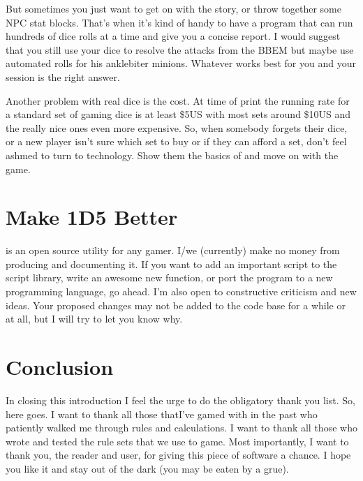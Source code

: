 But sometimes you just want to get on with the story, or throw together some
NPC stat blocks. That's when it's kind of handy to have a program that can
run hundreds of dice rolls at a time and give you a concise report. I would
suggest that you still use your dice to resolve the attacks from the BBEM
but maybe use automated rolls for his anklebiter minions. Whatever works best
for you and your session is the right answer.

Another problem with real dice is the cost. At time of print the running rate
for a standard set of gaming dice is at least \$5US with most sets around \$10US
and the really nice ones even more expensive. So, when somebody forgets their
dice, or a new player isn't sure which set to buy or if they can afford a set,
don't feel ashmed to turn to technology. Show them the basics of \progLogo and
move on with the game.


\section{Make 1D5 Better}
\label{improve}
\progLogo is an open source utility for any gamer. I/we (currently) make no
money from producing and documenting it. If you want to add an important script
to the script library, write an awesome new function, or port the program to a
new programming language, go ahead. I'm also open to constructive criticism
and new ideas. Your proposed changes may not be added to the code base for a
while or at all, but I will try to let you know why.

\section{Conclusion}
In closing this introduction I feel the urge to do the obligatory thank you
list. So, here goes. I want to thank all those thatI've gamed with in the
past who patiently walked me through rules and calculations. I want to thank
all those who wrote and tested the rule sets that we use to game. Most
importantly, I want to thank you, the reader and user, for giving this piece
of software a  chance. I hope you like it and stay out of the dark 
(you may be eaten by a grue).
